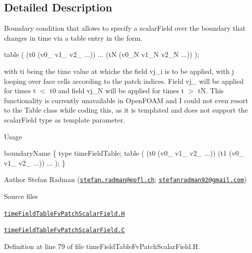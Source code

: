 \subsection{Detailed Description}
Boundary condition that allows to specify a scalar\+Field over the boundary that changes in time via a table entry in the form. 

\label{_Description}%
 table ( (t0 (v0\+\_ v1\+\_ v2\+\_ ...)) ... (tN (v0\+\_\+N v1\+\_\+N v2\+\_\+N ...)) );

with ti being the time value at whiche the field vj\+\_\+i is to be applied, with j looping over face cells according to the patch indices. Field vj\+\_ will be applied for times t $<$ t0 and field vj\+\_\+N will be applied for times t $>$ tN. This functionality is currently unavailable in Open\+F\+O\+AM and I could not even resort to the Table class while coding this, as it is templated and does not support the scalar\+Field type as template parameter.

\begin{DoxyParagraph}{Usage}

\end{DoxyParagraph}
boundary\+Name \{ type time\+Field\+Table; table ( (t0 (v0\+\_ v1\+\_ v2\+\_ ...)) (t1 (v0\+\_ v1\+\_ v2\+\_ ...)) ... ); \}

Author Stefan Radman (\href{mailto:stefan.radman@epfl.ch}{\tt stefan.\+radman@epfl.\+ch}; \href{mailto:stefanradman92@gmail.com}{\tt stefanradman92@gmail.\+com})

\begin{DoxyParagraph}{Source files}

\begin{DoxyItemize}
\item \href{../../../home/carlo/data/GeN-Foam/GeN-Foam_ffn/GeN-Foam/GeN-Foam/classes/thermalHydraulics/src/boundaryConditions/timeFieldTable/timeFieldTableFvPatchScalarField.H}{\tt time\+Field\+Table\+Fv\+Patch\+Scalar\+Field.\+H} 
\item \href{../../../home/carlo/data/GeN-Foam/GeN-Foam_ffn/GeN-Foam/GeN-Foam/classes/thermalHydraulics/src/boundaryConditions/timeFieldTable/timeFieldTableFvPatchScalarField.C}{\tt time\+Field\+Table\+Fv\+Patch\+Scalar\+Field.\+C} 
\end{DoxyItemize}
\end{DoxyParagraph}


Definition at line 79 of file time\+Field\+Table\+Fv\+Patch\+Scalar\+Field.\+H.



